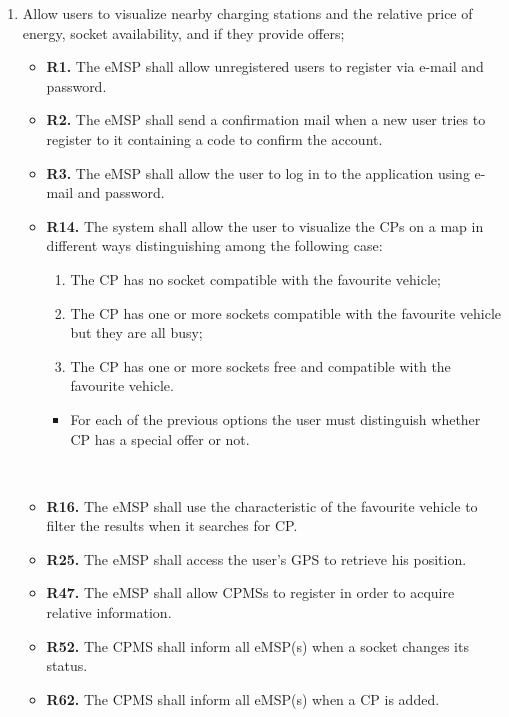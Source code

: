 \documentclass{Configuration_Files/PoliMi3i_thesis}
\begin{document}
\begin{enumerate}[label=\textbf{G\arabic*}]

    \item Allow users to visualize nearby charging stations and the relative price of energy, socket availability, and if they provide offers;
        \begin{itemize}
            \item \textbf{R1.} The eMSP shall allow unregistered users to register via e-mail and password.
            \item \textbf{R2.} The eMSP shall send a confirmation mail when a new user tries to register to it containing a code to confirm the account.
            \item \textbf{R3.} The eMSP shall allow the user to log in to the application using e-mail and password.
            \item \textbf{R14.}  The system shall allow the user to visualize the CPs on a map in different ways distinguishing among the following case:
                \begin{enumerate}
                    \item The CP has no socket compatible with the favourite vehicle;
                    \item The CP has one or more sockets compatible with the favourite vehicle but they are all busy;
                    \item The CP has one or more sockets free and compatible with the favourite vehicle.
                \end{enumerate}
                \begin{itemize}
                    \item For each of the previous options the user must distinguish whether CP has a special offer or not.
                \end{itemize}\B\\
            \item \textbf{R16.} The eMSP shall use the characteristic of the favourite vehicle to filter the results when it searches for CP.
            \item \textbf{R25.} The eMSP shall access the user’s GPS to retrieve his position.
            \item \textbf{R47.} The eMSP shall allow CPMSs to register in order to acquire relative information.
            \item \textbf{R52.} The CPMS shall inform all eMSP(s) when a socket changes its status.
            \item \textbf{R62.} The CPMS shall inform all eMSP(s) when a CP is added.

\end{itemize}
\end{enumerate}
\end{document}
